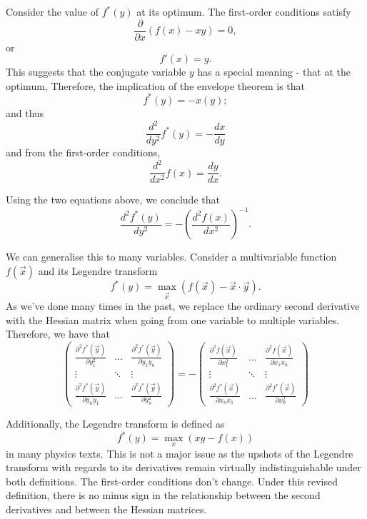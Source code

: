 \documentclass[a4paper, 12pt,oneside,openany]{book}
\begin{document}
Consider the value of $f^*(y)$ at its optimum. The first-order conditions satisfy $$\frac{\partial}{\partial x} (f(x)-xy)=0,$$ or $$f'(x)=y.$$ This suggests that the conjugate variable $y$ has a special meaning - that at the optimum,  Therefore, the implication of the envelope theorem is that $$f^*(y) = -x(y);$$ and thus \begin{equation}\frac{d^2}{dy^2}f^*(y) = -\frac{dx}{dy} \end{equation} and from the first-order conditions, \begin{equation}\frac{d^2}{dx^2} f(x) = \frac{dy}{dx}.\end{equation}

Using the two equations above, we conclude that $$\frac{d^2 f^*(y)}{dy^2} = -\left(\frac{d^2 f(x)}{dx^2}\right)^{-1}.$$

We can generalise this to many variables. Consider a multivariable function $f(\vec{x})$ and its Legendre transform $$f^*(y) = \max\limits_{\vec{x}} (f(\vec{x}) - \vec{x} \cdot \vec{y}).$$ As we've done many times in the past, we replace the ordinary second derivative with the Hessian matrix when going from one variable to multiple variables. Therefore, we have that $$\begin{pmatrix} \frac{\partial^2 f^*(\vec{y})}{\partial y_1^2} & \dots &  \frac{\partial^2 f^*(\vec{y})}{\partial y_1y_n} \\ \vdots & \ddots & \vdots \\  \frac{\partial^2 f^*(\vec{y})}{\partial y_ny_1} & \dots &  \frac{\partial^2 f^*(\vec{y})}{\partial y_n^2}\end{pmatrix}=-\begin{pmatrix} \frac{\partial^2 f(\vec{x})}{\partial x_1^2} & \dots &  \frac{\partial^2 f(\vec{x})}{\partial x_1x_n} \\ \vdots & \ddots & \vdots \\  \frac{\partial^2 f^*(\vec{x})}{\partial x_nx_1} & \dots &  \frac{\partial^2 f^*(\vec{x})}{\partial x_n^2}\end{pmatrix}  $$


Additionally, the Legendre transform is defined as $$f^*(y) = \max\limits_x (xy-f(x))$$ in many physics texts. This is not a major issue as the upshots of the Legendre transform with regards to its derivatives remain virtually indistinguishable under both definitions. The first-order conditions don't change. Under this revised definition, there is no minus sign in the relationship between the second derivatives and between the Hessian matrices.
\end{document}
